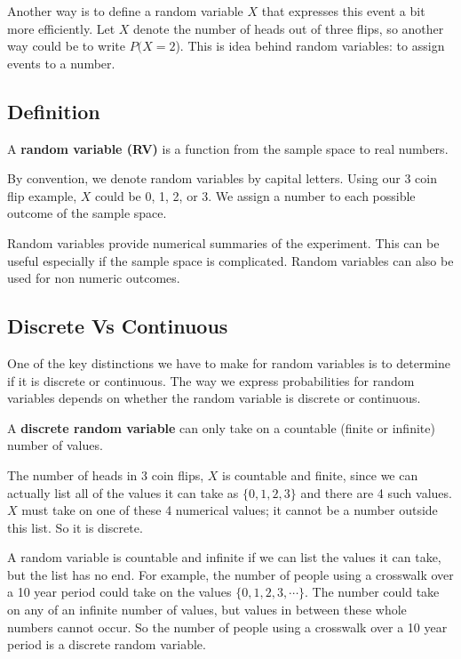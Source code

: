 \documentclass[
]{book}
\begin{document}
Another way is to define a random variable \(X\) that expresses this event a bit more efficiently. Let \(X\) denote the number of heads out of three flips, so another way could be to write \(P(X=2\)). This is idea behind random variables: to assign events to a number.

\subsection{Definition}\label{definition}

A \textbf{random variable (RV)} is a function from the sample space to real numbers.

By convention, we denote random variables by capital letters. Using our 3 coin flip example, \(X\) could be 0, 1, 2, or 3. We assign a number to each possible outcome of the sample space.

Random variables provide numerical summaries of the experiment. This can be useful especially if the sample space is complicated. Random variables can also be used for non numeric outcomes.

\subsection{Discrete Vs Continuous}\label{discrete-vs-continuous}

One of the key distinctions we have to make for random variables is to determine if it is discrete or continuous. The way we express probabilities for random variables depends on whether the random variable is discrete or continuous.

A \textbf{discrete random variable} can only take on a countable (finite or infinite) number of values.

The number of heads in 3 coin flips, \(X\) is countable and finite, since we can actually list all of the values it can take as \(\{0,1,2,3 \}\) and there are 4 such values. \(X\) must take on one of these 4 numerical values; it cannot be a number outside this list. So it is discrete.

A random variable is countable and infinite if we can list the values it can take, but the list has no end. For example, the number of people using a crosswalk over a 10 year period could take on the values \(\{0, 1, 2, 3, \cdots \}\). The number could take on any of an infinite number of values, but values in between these whole numbers cannot occur. So the number of people using a crosswalk over a 10 year period is a discrete random variable.
\end{document}
